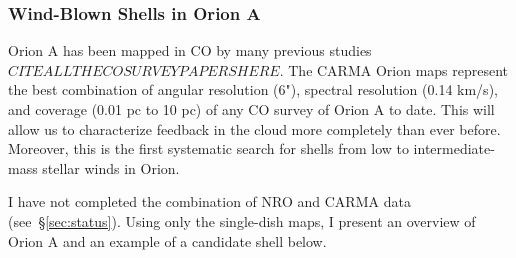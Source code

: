         \subsubsection{Wind-Blown Shells in Orion A}\label{sec:paper1}
Orion A has been mapped in CO by many previous studies$CITE ALL THE CO SURVEY PAPERS HERE$. The CARMA Orion maps represent the best combination of angular resolution (6"), spectral resolution (0.14 km/s), and coverage (0.01 pc to 10 pc) of any CO survey of Orion A to date. This will allow us to characterize feedback in the cloud more completely than ever before. Moreover, this is the first systematic search for shells from low to intermediate-mass stellar winds in Orion.
        
I have not completed the combination of NRO and CARMA data (see~\S\ref{sec:status}).  Using only the single-dish maps, I present an overview of Orion A and an example of a candidate shell below.
    
  
